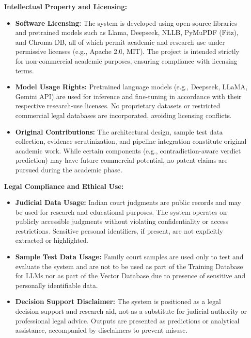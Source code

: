 \textbf{Intellectual Property and Licensing:}
\begin{itemize}
	\item \textbf{Software Licensing:} 
	The system is developed using open-source libraries and pretrained models such as Llama, Deepseek, NLLB, PyMuPDF (Fitz), and Chroma DB, all of which permit academic and research use under permissive licenses (e.g., Apache 2.0, MIT). The project is intended strictly for non-commercial academic purposes, ensuring compliance with licensing terms.
	
	\item \textbf{Model Usage Rights:}
	Pretrained language models (e.g., Deepseek, LLaMA, Gemini API) are used for inference and fine-tuning in accordance with their respective research-use licenses. No proprietary datasets or restricted commercial legal databases are incorporated, avoiding licensing conflicts.
	
	\item \textbf{Original Contributions:}
	The architectural design, sample test data collection, evidence scrutinization, and pipeline integration constitute original academic work. While certain components (e.g., contradiction-aware verdict prediction) may have future commercial potential, no patent claims are pursued during the academic phase.
\end{itemize}

\textbf{Legal Compliance and Ethical Use:}
\begin{itemize}
	\item \textbf{Judicial Data Usage:}
	Indian court judgments are public records and may be used for research and educational purposes. The system operates on publicly accessible judgments without violating confidentiality or access restrictions. Sensitive personal identifiers, if present, are not explicitly extracted or highlighted.
	
	\item \textbf{Sample Test Data Usage:}
	Family court samples are used only to test and evaluate the system and are not to be used as part of the Training Database for LLMs nor as part of the Vector Database due to presence of sensitive and personally identifiable data.
	
	\item \textbf{Decision Support Disclaimer:}
	The system is positioned as a legal decision-support and research aid, not as a substitute for judicial authority or professional legal advice. Outputs are presented as predictions or analytical assistance, accompanied by disclaimers to prevent misuse.
\end{itemize}

